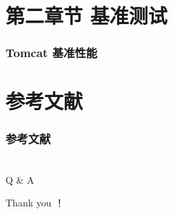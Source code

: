\documentclass{beamer}
\begin{document}
\section{第二章节 基准测试}



\begin{frame}
\frametitle{Tomcat 基准性能}

\end{frame}


\section{参考文献}

\begin{frame}[allowframebreaks]
    \frametitle{参考文献}
    \small
    
    
\end{frame}

\section*{}


\begin{frame}
    \centering
   \Huge Q \& A
\end{frame}

\begin{frame}
\centering
\Huge Thank you ！
\end{frame}
\end{document}
